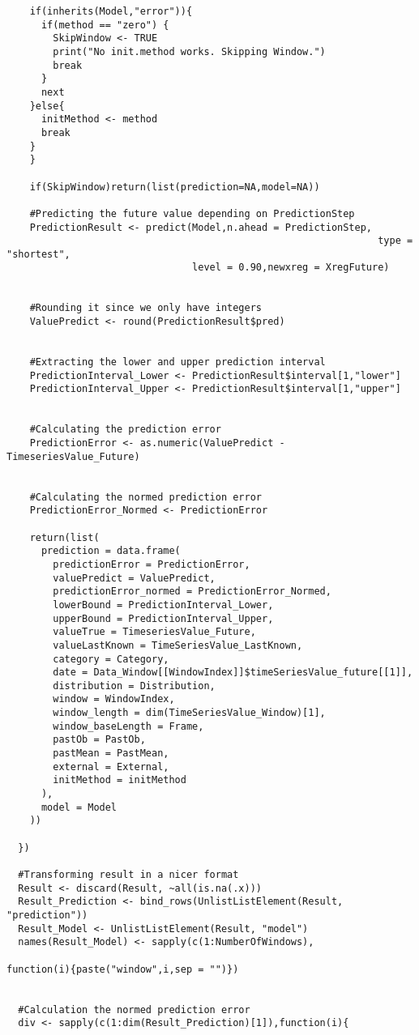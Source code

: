 \begin{verbatim}
    if(inherits(Model,"error")){
      if(method == "zero") {
        SkipWindow <- TRUE
        print("No init.method works. Skipping Window.")
        break
      }
      next
    }else{
      initMethod <- method
      break 
    }
    }
    
    if(SkipWindow)return(list(prediction=NA,model=NA))
    
    #Predicting the future value depending on PredictionStep
    PredictionResult <- predict(Model,n.ahead = PredictionStep,
																type = "shortest",
                                level = 0.90,newxreg = XregFuture)
    
    
    #Rounding it since we only have integers
    ValuePredict <- round(PredictionResult$pred)
    
    
    #Extracting the lower and upper prediction interval 
    PredictionInterval_Lower <- PredictionResult$interval[1,"lower"]
    PredictionInterval_Upper <- PredictionResult$interval[1,"upper"]
    
    
    #Calculating the prediction error
    PredictionError <- as.numeric(ValuePredict - TimeseriesValue_Future)
    
  
    #Calculating the normed prediction error
    PredictionError_Normed <- PredictionError
    
    return(list(
      prediction = data.frame(
        predictionError = PredictionError,
        valuePredict = ValuePredict,
        predictionError_normed = PredictionError_Normed,
        lowerBound = PredictionInterval_Lower,
        upperBound = PredictionInterval_Upper,
        valueTrue = TimeseriesValue_Future,
        valueLastKnown = TimeSeriesValue_LastKnown,
        category = Category,
        date = Data_Window[[WindowIndex]]$timeSeriesValue_future[[1]],
        distribution = Distribution,
        window = WindowIndex,
        window_length = dim(TimeSeriesValue_Window)[1],
        window_baseLength = Frame,
        pastOb = PastOb,
        pastMean = PastMean,
        external = External,
        initMethod = initMethod
      ),
      model = Model
    ))
    
  })
  
  #Transforming result in a nicer format
  Result <- discard(Result, ~all(is.na(.x)))
  Result_Prediction <- bind_rows(UnlistListElement(Result, "prediction"))
  Result_Model <- UnlistListElement(Result, "model")
  names(Result_Model) <- sapply(c(1:NumberOfWindows),
																function(i){paste("window",i,sep = "")})
  
  
  #Calculation the normed prediction error 
  div <- sapply(c(1:dim(Result_Prediction)[1]),function(i){
    

\end{verbatim}
